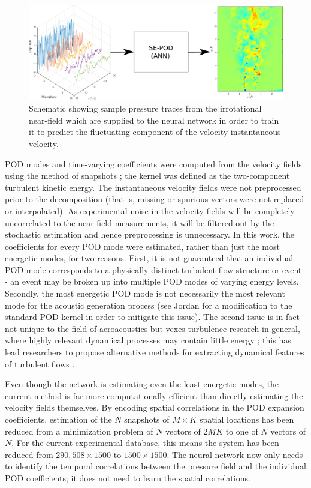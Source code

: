 \begin{figure}
	\centering
	\includegraphics[width = \linewidth]{Figures/pressure_mapping.png}
	\caption{Schematic showing sample pressure traces from the irrotational near-field which are supplied to the neural network in order to train it to predict the fluctuating component of the velocity instantaneous velocity.}
	\label{fig:ch4_pressure_mapping}
\end{figure}

POD modes and time-varying coefficients were computed from the velocity fields using the method of snapshots \citep{Sirovich1987}; the kernel was defined as the two-component turbulent kinetic energy.
The instantaneous velocity fields were not preprocessed prior to the decomposition (that is, missing or spurious vectors were not replaced or interpolated).
As experimental noise in the velocity fields will be completely uncorrelated to the near-field measurements, it will be filtered out by the stochastic estimation and hence preprocessing is unnecessary.
In this work, the coefficients for every POD mode were estimated, rather than just the most energetic modes, for two reasons.
First, it is not guaranteed that an individual POD mode corresponds to a physically distinct turbulent flow structure or event - an event may be broken up into multiple POD modes of varying energy levels.
Secondly, the most energetic POD mode is not necessarily the most relevant mode for the acoustic generation process (see Jordan \etal \citep{Jordan2007} for a modification to the standard POD kernel in order to mitigate this issue).
The second issue is in fact not unique to the field of aeroacoustics but vexes turbulence research in general, where highly relevant dynamical processes may contain little energy \citep{Noack2008}; this has lead researchers to propose alternative methods for extracting dynamical features of turbulent flows \citep{Schmid2010}.

Even though the network is estimating even the least-energetic modes, the current method is far more computationally efficient than directly estimating the velocity fields themselves.
By encoding spatial correlations in the POD expansion coefficients, estimation of the $N$ snapshots of $M \times K$ spatial locations has been reduced from a minimization problem of $N$ vectors of $2MK$ to one of $N$ vectors of $N$.
For the current experimental database, this means the system has been reduced from $290,508 \times 1500$ to $1500 \times 1500$.
The neural network now only needs to identify the temporal correlations between the pressure field and the individual POD coefficients; it does not need to learn the spatial correlations.

